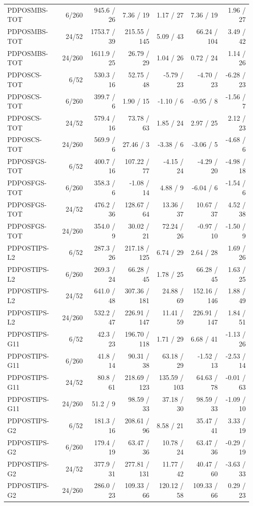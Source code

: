 \documentclass[10pt,a4paper]{article}
\begin{document}
\begin{longtable}{p{26mm}rrrrrr}
PDPOSMBS-TOT & 6/260 & 945.6 / 26 & 7.36 / 19 & 1.17 / 27 & 7.36 / 19 & 1.96 / 27 \\
PDPOSMBS-TOT & 24/52 & 1753.7 / 39 & 215.55 / 145 & 5.09 / 43 & 66.24 / 104 & 3.49 / 42 \\
PDPOSMBS-TOT & 24/260 & 1611.9 / 25 & 26.79 / 29 & 1.04 / 26 & 0.72 / 24 & 1.14 / 26 \\
PDPOSCS-TOT & 6/52 & 530.3 / 16 & 52.75 / 48 & -5.79 / 23 & -4.70 / 23 & -6.28 / 23 \\
PDPOSCS-TOT & 6/260 & 399.7 / 6 & 1.90 / 15 & -1.10 / 6 & -0.95 / 8 & -1.56 / 7 \\
PDPOSCS-TOT & 24/52 & 579.4 / 16 & 73.78 / 63 & 1.85 / 24 & 2.97 / 25 & 2.12 / 23 \\
PDPOSCS-TOT & 24/260 & 569.9 / 6 & 27.46 / 3 & -3.38 / 6 & -3.06 / 5 & -4.68 / 6 \\
PDPOSFGS-TOT & 6/52 & 400.7 / 16 & 107.22 / 77 & -4.15 / 24 & -4.29 / 20 & -4.98 / 18 \\
PDPOSFGS-TOT & 6/260 & 358.3 / 6 & -1.08 / 14 & 4.88 / 9 & -6.04 / 6 & -1.54 / 6 \\
PDPOSFGS-TOT & 24/52 & 476.2 / 36 & 128.67 / 64 & 13.36 / 37 & 10.67 / 37 & 4.52 / 38 \\
PDPOSFGS-TOT & 24/260 & 354.0 / 9 & 30.02 / 21 & 72.24 / 26 & -0.97 / 10 & -1.50 / 9 \\
PDPOSTIPS-L2 & 6/52 & 287.3 / 26 & 217.18 / 125 & 6.74 / 29 & 2.64 / 28 & 1.69 / 26 \\
PDPOSTIPS-L2 & 6/260 & 269.3 / 24 & 66.28 / 45 & 1.78 / 25 & 66.28 / 45 & 1.63 / 25 \\
PDPOSTIPS-L2 & 24/52 & 641.0 / 48 & 307.36 / 181 & 24.88 / 69 & 152.16 / 146 & 1.88 / 49 \\
PDPOSTIPS-L2 & 24/260 & 532.2 / 47 & 226.91 / 147 & 11.41 / 59 & 226.91 / 147 & 1.84 / 51 \\
PDPOSTIPS-G11 & 6/52 & 42.3 / 23 & 196.70 / 118 & 1.71 / 29 & 6.68 / 41 & -1.13 / 26 \\
PDPOSTIPS-G11 & 6/260 & 41.8 / 14 & 90.31 / 38 & 63.18 / 29 & -1.52 / 13 & -2.53 / 14 \\
PDPOSTIPS-G11 & 24/52 & 80.8 / 61 & 218.69 / 123 & 135.59 / 103 & 64.63 / 78 & -0.01 / 63 \\
PDPOSTIPS-G11 & 24/260 & 51.2 / 9 & 98.59 / 33 & 37.18 / 30 & 98.59 / 33 & -1.09 / 10 \\
PDPOSTIPS-G2 & 6/52 & 181.3 / 16 & 208.61 / 96 & 8.58 / 21 & 35.47 / 41 & 3.33 / 19 \\
PDPOSTIPS-G2 & 6/260 & 179.4 / 19 & 63.47 / 36 & 10.78 / 24 & 63.47 / 36 & -0.29 / 19 \\
PDPOSTIPS-G2 & 24/52 & 377.9 / 31 & 277.81 / 131 & 11.77 / 42 & 40.47 / 60 & -3.63 / 33 \\
PDPOSTIPS-G2 & 24/260 & 286.0 / 23 & 109.33 / 66 & 120.12 / 58 & 109.33 / 66 & 0.29 / 23 \\
\end{longtable}
\endgroup
\end{document}
